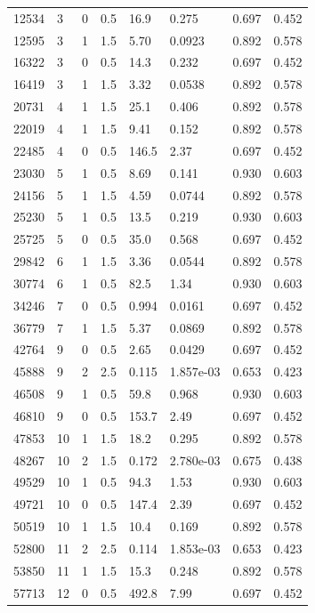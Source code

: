 \documentclass[preview]{standalone}
\begin{document}
{{\begin{tabular}{L{1.2cm}C{1.2cm} C{0.3cm}C{0.5cm} C{1.4cm}C{1.4cm} C{1.4cm}C{1.4cm}}
  12534  &     3  & 0     & 0.5 &  16.9  & 0.275  & 0.697 &  0.452   \\ 
  12595  &     3  & 1     & 1.5 &  5.70  & 0.0923  & 0.892 &  0.578   \\ 
  16322  &     3  & 0     & 0.5 &  14.3  & 0.232  & 0.697 &  0.452   \\ 
  16419  &     3  & 1     & 1.5 &  3.32  & 0.0538  & 0.892 &  0.578   \\ 
  20731  &     4  & 1     & 1.5 &  25.1  & 0.406  & 0.892 &  0.578   \\ 
  22019  &     4  & 1     & 1.5 &  9.41  & 0.152  & 0.892 &  0.578   \\ 
  22485  &     4  & 0     & 0.5 &  146.5  & 2.37  & 0.697 &  0.452   \\ 
  23030  &     5  & 1     & 0.5 &  8.69  & 0.141  & 0.930 &  0.603   \\ 
  24156  &     5  & 1     & 1.5 &  4.59  & 0.0744  & 0.892 &  0.578   \\ 
  25230  &     5  & 1     & 0.5 &  13.5  & 0.219  & 0.930 &  0.603   \\ 
  25725  &     5  & 0     & 0.5 &  35.0  & 0.568  & 0.697 &  0.452   \\ 
  29842  &     6  & 1     & 1.5 &  3.36  & 0.0544  & 0.892 &  0.578   \\ 
  30774  &     6  & 1     & 0.5 &  82.5  & 1.34  & 0.930 &  0.603   \\ 
  34246  &     7  & 0     & 0.5 &  0.994  & 0.0161  & 0.697 &  0.452   \\ 
  36779  &     7  & 1     & 1.5 &  5.37  & 0.0869  & 0.892 &  0.578   \\ 
  42764  &     9  & 0     & 0.5 &  2.65  & 0.0429  & 0.697 &  0.452   \\ 
  45888  &     9  & 2     & 2.5 &  0.115  & 1.857e-03  & 0.653 &  0.423   \\ 
  46508  &     9  & 1     & 0.5 &  59.8  & 0.968  & 0.930 &  0.603   \\ 
  46810  &     9  & 0     & 0.5 &  153.7  & 2.49  & 0.697 &  0.452   \\ 
  47853  &    10  & 1     & 1.5 &  18.2  & 0.295  & 0.892 &  0.578   \\ 
  48267  &    10  & 2     & 1.5 &  0.172  & 2.780e-03  & 0.675 &  0.438   \\ 
  49529  &    10  & 1     & 0.5 &  94.3  & 1.53  & 0.930 &  0.603   \\ 
  49721  &    10  & 0     & 0.5 &  147.4  & 2.39  & 0.697 &  0.452   \\ 
  50519  &    10  & 1     & 1.5 &  10.4  & 0.169  & 0.892 &  0.578   \\ 
  52800  &    11  & 2     & 2.5 &  0.114  & 1.853e-03  & 0.653 &  0.423   \\ 
  53850  &    11  & 1     & 1.5 &  15.3  & 0.248  & 0.892 &  0.578   \\ 
  57713  &    12  & 0     & 0.5 &  492.8  & 7.99  & 0.697 &  0.452   \\ 
\hline 
\end{tabular} 

}}
\end{document}
